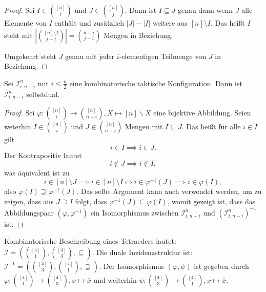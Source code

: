 \documentclass{article}
\begin{document}
\begin{proof}
  Sei $I \in \binom{[n]}{i}$ und $J \in \binom{[n]}{j}$.
  Dann ist $I \subseteq J$ genau dann wenn $J$ alle Elemente von $I$ enthält
  und zusätzlich $|J| - |I|$ weitere aus $[n] \setminus I$.
  Das heißt $I$ steht mit $|\binom{[n] \setminus I}{j - i}| = \binom{n - i}{j - i}$ Mengen in Beziehung.

  Umgekehrt steht $J$ genau mit jeder $i$-elementigen Teilmenge von $J$ in Beziehung.
\end{proof}

\begin{theorem}
  Sei $\mathcal{I}^n_{i, n - i}$ mit $i \leq \frac{n}{2}$ eine kombinatorische taktische Konfiguration.
  Dann ist $\mathcal{I}^n_{i, n - i}$ selbstdual.
\end{theorem}
\begin{proof}
  Sei $\varphi \colon \binom{[n]}{i} \to \binom{[n]}{n - i}, X \mapsto [n] \backslash X$ eine bijektive Abbildung.
  Seien weterhin $I \in \binom{[n]}{i}$ und $J \in \binom{[n]}{n - i}$ Mengen
  mit $I \subseteq J$.
  Das heißt für alle $i \in I$ gilt
  \begin{equation*}
    i \in I \implies i \in J.
  \end{equation*}
  Der Kontrapositiv lautet
  \begin{equation*}
    i \notin J \implies i \notin I,
  \end{equation*}
  was äquivalent ist zu
  \begin{equation*}
    i \in [n] \setminus J \implies i \in [n] \setminus I
    \iff i \in \varphi^{-1}(J) \implies i \in \varphi(I),
  \end{equation*}
  also $\varphi(I) \supseteq \varphi^{-1}(J)$.
  Das selbe Argument kann auch verwendet werden, um zu zeigen,
  dass aus $J \supseteq I$ folgt, dass $\varphi^{-1}(J) \subseteq \varphi(I)$,
  womit gezeigt ist,
  dass das Abbildungspaar $(\varphi, \varphi^{-1})$ ein Isomorphismus
  zwischen $\mathcal{I}^n_{i, n - i}$ und $(\mathcal{I}^n_{i, n - i})^{-1}$ ist.
\end{proof}

\begin{example}[Tetraeder]
  Kombinatorische Beschreibung eines Tetraeders lautet: ${\mathcal{I} =  (\binom{[4]}{1}, \binom{[4]}{3}, \subseteq)}$.
  Die duale Inzidenzstruktur ist: ${\mathcal{I}^{-1} = (\binom{[4]}{3}, \binom{[4]}{1}, \supseteq)}$.
  Der Isomorphismus  $(\varphi, \psi)$ ist gegeben durch
  ${\varphi \colon \binom{[4]}{1} \to \binom{[4]}{3}, x \mapsto \overline{x}}$
  und weiterhin ${\psi \colon \binom{[4]}{3} \to \binom{[4]}{1}, x \mapsto \overline{x}}$.
\end{example}
\end{document}
